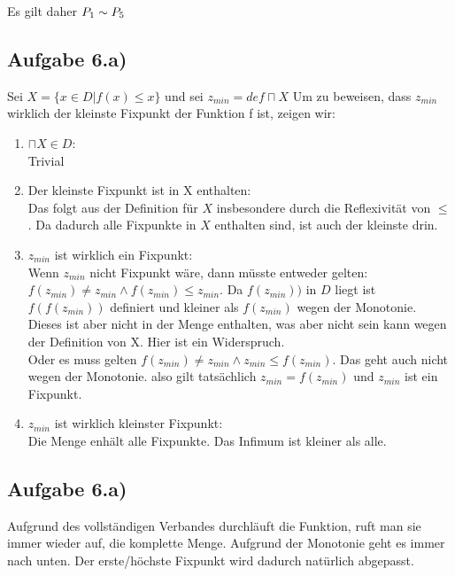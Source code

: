 \documentclass[10pt,a4paper,german,landscape,fleqn]{article} \usepackage[utf8]{inputenc} %
\begin{document}
Es gilt daher $P_1 \sim P_5$

\subsection*{Aufgabe 6.a)}
Sei $X=\{x \in D | f(x) \le x \}$ und sei $z_{min} =def  \sqcap X$
Um zu beweisen, dass $z_{min}$ wirklich der kleinste Fixpunkt der Funktion f ist, zeigen wir:
\begin{enumerate}
  \item $\sqcap X \in D$: \\
    Trivial
  \item Der kleinste Fixpunkt ist in X enthalten: \\
    Das folgt aus der Definition für $X$ insbesondere durch die Reflexivität von $\le$. Da dadurch alle Fixpunkte in $X$ enthalten sind, ist auch der kleinste drin.
  \item $z_{min}$ ist wirklich ein Fixpunkt: \\
    Wenn $z_{min}$ nicht Fixpunkt wäre, dann müsste entweder gelten: $f(z_{min}) \neq z_{min} \wedge f(z_{min}) \le z_{min} $.
    Da $f(z_{min}))$ in $D$ liegt ist $f(f(z_{min}))$ definiert und kleiner als $f(z_{min})$ wegen der Monotonie. Dieses ist aber nicht in der Menge enthalten, was aber nicht sein kann wegen der Definition von X. Hier ist ein Widerspruch.\\
    Oder es muss gelten $f(z_{min}) \neq z_{min} \wedge z_{min} \le f(z_{min}) $. Das geht auch nicht wegen der Monotonie. also gilt tatsächlich $z_{min} = f(z_{min})$ und $z_{min}$ ist ein Fixpunkt.
  \item $z_{min}$ ist wirklich kleinster Fixpunkt: \\
    Die Menge enhält alle Fixpunkte. Das Infimum ist kleiner als alle.

\end{enumerate}

\subsection*{Aufgabe 6.a)}
Aufgrund des vollständigen Verbandes durchläuft die Funktion, ruft man sie immer wieder auf, die komplette Menge. Aufgrund der Monotonie geht es immer nach unten. Der erste/höchste Fixpunkt wird dadurch natürlich abgepasst.
\end{document}
